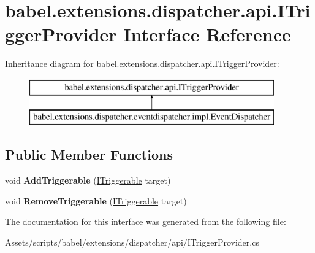 \hypertarget{interfacebabel_1_1extensions_1_1dispatcher_1_1api_1_1_i_trigger_provider}{\section{babel.\-extensions.\-dispatcher.\-api.\-I\-Trigger\-Provider Interface Reference}
\label{interfacebabel_1_1extensions_1_1dispatcher_1_1api_1_1_i_trigger_provider}
}
Inheritance diagram for babel.\-extensions.\-dispatcher.\-api.\-I\-Trigger\-Provider\-:\begin{figure}[H]
\begin{center}
\leavevmode
\includegraphics[height=2.000000cm]{interfacebabel_1_1extensions_1_1dispatcher_1_1api_1_1_i_trigger_provider}
\end{center}
\end{figure}
\subsection*{Public Member Functions}
\begin{DoxyCompactItemize}
\item 
\hypertarget{interfacebabel_1_1extensions_1_1dispatcher_1_1api_1_1_i_trigger_provider_a20c3ec2ce9b93c256a6b444b700c8af8}{void {\bfseries Add\-Triggerable} (\hyperlink{interfacebabel_1_1extensions_1_1dispatcher_1_1api_1_1_i_triggerable}{I\-Triggerable} target)}\label{interfacebabel_1_1extensions_1_1dispatcher_1_1api_1_1_i_trigger_provider_a20c3ec2ce9b93c256a6b444b700c8af8}

\item 
\hypertarget{interfacebabel_1_1extensions_1_1dispatcher_1_1api_1_1_i_trigger_provider_a13b4a06c3fce7ef3ad1a5c0d3f4e0a14}{void {\bfseries Remove\-Triggerable} (\hyperlink{interfacebabel_1_1extensions_1_1dispatcher_1_1api_1_1_i_triggerable}{I\-Triggerable} target)}\label{interfacebabel_1_1extensions_1_1dispatcher_1_1api_1_1_i_trigger_provider_a13b4a06c3fce7ef3ad1a5c0d3f4e0a14}

\end{DoxyCompactItemize}


The documentation for this interface was generated from the following file\-:\begin{DoxyCompactItemize}
\item 
Assets/scripts/babel/extensions/dispatcher/api/I\-Trigger\-Provider.\-cs\end{DoxyCompactItemize}
